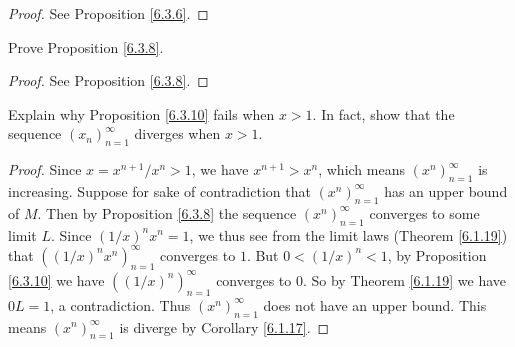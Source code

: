 \begin{proof}
See Proposition \ref{6.3.6}.
\end{proof}

\begin{exercise}\label{ex 6.3.3}
Prove Proposition \ref{6.3.8}.
\end{exercise}

\begin{proof}
See Proposition \ref{6.3.8}.
\end{proof}

\begin{exercise}\label{ex 6.3.4}
Explain why Proposition \ref{6.3.10} fails when \(x > 1\).
In fact, show that the sequence \((x_n)_{n = 1}^\infty\) diverges when \(x > 1\).
\end{exercise}

\begin{proof}
Since \(x = x^{n + 1} / x^n > 1\), we have \(x^{n + 1} > x^n\), which means \((x^n)_{n = 1}^\infty\) is increasing.
Suppose for sake of contradiction that \((x^n)_{n = 1}^\infty\) has an upper bound of \(M\).
Then by Proposition \ref{6.3.8} the sequence \((x^n)_{n = 1}^\infty\) converges to some limit \(L\).
Since \((1 / x)^n x^n = 1\), we thus see from the limit laws (Theorem \ref{6.1.19}) that \(((1 / x)^n x^n)_{n = 1}^\infty\) converges to \(1\).
But \(0 < (1 / x)^n < 1\), by Proposition \ref{6.3.10} we have \(((1 / x)^n)_{n = 1}^\infty\) converges to \(0\).
So by Theorem \ref{6.1.19} we have \(0L = 1\), a contradiction.
Thus \((x^n)_{n = 1}^\infty\) does not have an upper bound.
This means \((x^n)_{n = 1}^\infty\) is diverge by Corollary \ref{6.1.17}.
\end{proof}